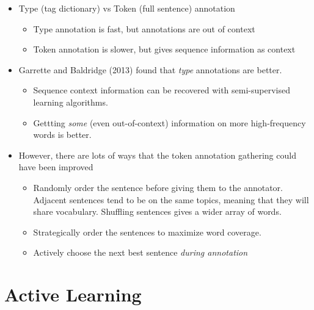 \documentclass[11pt,letterpaper]{article}
\begin{document}
\begin{itemize}
  \item Type (tag dictionary) vs Token (full sentence) annotation
    \begin{itemize}
      \item Type annotation is fast, but annotations are out of context
      \item Token annotation is slower, but gives sequence information as context
    \end{itemize}
  \item Garrette and Baldridge (2013) found that \textit{type} annotations are better.
    \begin{itemize}
      \item Sequence context information can be recovered with semi-supervised learning algorithms.
      \item Gettting \textit{some} (even out-of-context) information on more high-frequency words is better.
    \end{itemize}
  \item However, there are lots of ways that the token annotation gathering could have been improved
    \begin{itemize}
      \item Randomly order the sentence before giving them to the annotator.  Adjacent sentences tend to be on the same topics, meaning that they will share vocabulary.  Shuffling sentences gives a wider array of words.
      \item Strategically order the sentences to maximize word coverage.
      \item Actively choose the next best sentence \textit{during annotation}
    \end{itemize}
\end{itemize}


\section{Active Learning}
\end{document}
